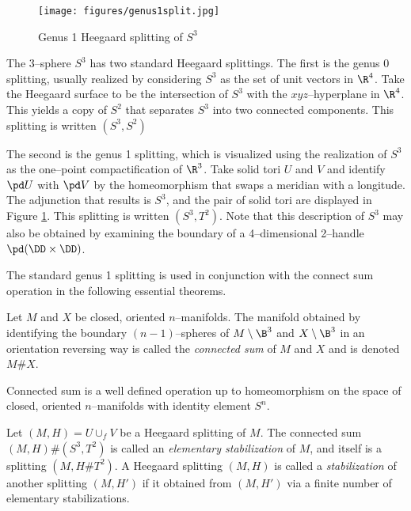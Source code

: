\begin{figure}
		\centering
		\caption{Genus 1 Heegaard splitting of $S^3$}
		\texttt{[image: figures/genus1split.jpg]}
		\label{fig:genus1split}
\end{figure}

\begin{ex}
	The 3--sphere $S^3$ has two standard Heegaard splittings.
	The first is the genus 0 splitting, usually realized by considering $S^3$ as the set of unit vectors in $\R^4$.
	Take the Heegaard surface to be the intersection of $S^3$ with the $xyz$--hyperplane in $\R^4$.
	This yields a copy of $S^2$ that separates $S^3$ into two connected components.
	This splitting is written $(S^3,S^2)$
	
	The second is the genus 1 splitting, which is visualized using the realization of $S^3$ as the one--point compactification of $\R^3$.
	Take solid tori $U$ and $V$ and identify $\pd U$ with $\pd V$ by the homeomorphism that swaps a meridian with a longitude.
	The adjunction that results is $S^3$, and the pair of solid tori are displayed in Figure \ref{fig:genus1split}.
	This splitting is written $(S^3,T^2)$.
	Note that this description of $S^3$ may also be obtained by examining the boundary of a 4--dimensional 2--handle $\pd (\DD\times\DD)$.
\end{ex}

The standard genus 1 splitting is used in conjunction with the connect sum operation in the following essential theorems.

\begin{defn}
	Let $M$ and $X$ be closed, oriented $n$--manifolds.
	The manifold obtained by identifying the boundary $(n-1)$--spheres of $M\setminus\B^3$ and $X\setminus\B^3$ in an orientation reversing way is called the \emph{connected sum} of $M$ and $X$ and is denoted $M\# X$.
\end{defn}

\begin{theorem}
	Connected sum is a well defined operation up to homeomorphism on the space of closed, oriented $n$--manifolds with identity element $S^n$.
\end{theorem}
	
\begin{defn}
	Let $(M,H)=U\cup_f V$ be a Heegaard splitting of $M$.
	The connected sum $(M,H)\#(S^3,T^2)$ is called an \emph{elementary stabilization} of $M$, and itself is a splitting $(M,H\#T^2)$.
	A Heegaard splitting $(M,H)$ is called a \emph{stabilization} of another splitting $(M,H')$ if it obtained from $(M,H')$ via a finite number of elementary stabilizations.
\end{defn}

